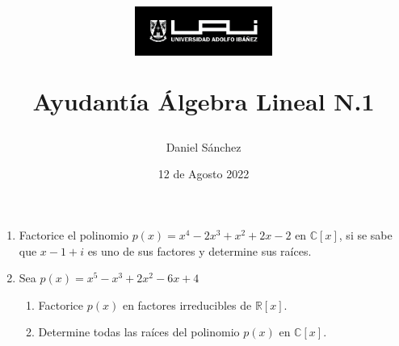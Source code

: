 \documentclass[12pt]{article}
\begin{document}
\title{
    \begin{figure}[ht]
        \centering
        \includegraphics[width = 0.4\textwidth, ]{logo-uai.jpg}\\
    \end{figure}
    Ayudant\'ia \'Algebra Lineal N.1}
\date{12 de Agosto 2022}
\author{Daniel S\'anchez}
\maketitle

\begin{enumerate}
    \item Factorice el polinomio $p(x) = x^4-2x^3+x^2+2x-2$ en $\mathbb{C}\left[x\right]$, si se sabe que
          $x-1+i$ es uno de sus factores y determine sus ra\'ices.
    \item Sea $p(x) = x^5-x^3+2x^2-6x+4$
          \begin{enumerate}
              \item Factorice $p(x)$ en factores irreducibles de $\mathbb{R}\left[x\right]$.
              \item Determine todas las ra\'ices del polinomio $p(x)$ en $\mathbb{C}\left[x\right]$.
          \end{enumerate}
          

\end{enumerate}
\end{document}
